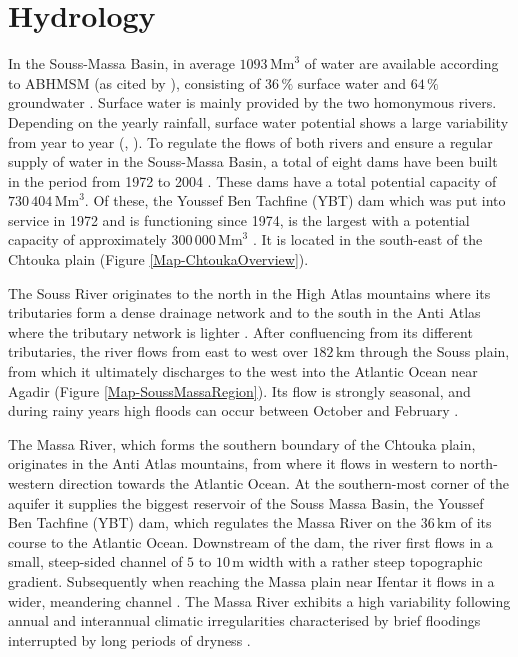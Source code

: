 \section{Hydrology}
\label{Sec-SouMaHydrology}

In the Souss-Massa Basin, in average $1093 \, \textrm{Mm}^3$ of water are available according to ABHMSM (as cited by \textcite{Choukr.2017}), consisting of $36 \, \%$ surface water and $64 \, \%$ groundwater \parencite{Choukr.2017}. 
Surface water is mainly provided by the two homonymous rivers. 
Depending on the yearly rainfall, surface water potential shows a large variability from year to year (\cite{Choukr.2017}, \cite{ABHSM-HydStats.2022}). 
To regulate the flows of both rivers and ensure a regular supply of water in the Souss-Massa Basin, a total of eight dams have been built in the period from 1972 to 2004 \parencite{Choukr.2017}. 
These dams have a total potential capacity of $730 \, 404 \, \textrm{Mm}^3$. 
Of these, the Youssef Ben Tachfine (YBT) dam which was put into service in 1972 and is functioning since 1974, is the largest with a potential capacity of approximately $300 \,000 \, \textrm{Mm}^3$ \parencite{ABHSM-Dams.2022}. 
It is located in the south-east of the Chtouka plain (Figure \ref{Map-ChtoukaOverview}).

The Souss River originates to the north in the High Atlas mountains where its tributaries form a dense drainage network and to the south in the Anti Atlas where the tributary network is lighter \parencite{Hssaisoune.2017}. 
After confluencing from its different tributaries, the river flows from east to west over $182 \, \textrm{km}$ through the Souss plain, from which it ultimately discharges to the west into the Atlantic Ocean near Agadir (Figure \ref{Map-SoussMassaRegion}). 
Its flow is strongly seasonal, and during rainy years high floods can occur between October and February \parencite{Hssaisoune.2017}.

The Massa River, which forms the southern boundary of the Chtouka plain, originates in the Anti Atlas mountains, from where it flows in western to north-western direction towards the Atlantic Ocean. 
At the southern-most corner of the aquifer it supplies the biggest reservoir of the Souss Massa Basin, the Youssef Ben Tachfine (YBT) dam, which regulates the Massa River on the $36 \, \textrm{km}$ of its course to the Atlantic Ocean. 
Downstream of the dam, the river first flows in a small, steep-sided channel of $5$ to $10 \, \textrm{m}$ width with a rather steep topographic gradient. 
Subsequently when reaching the Massa plain near Ifentar it flows in a wider, meandering channel \parencite{Horn.2021}. 
The Massa River exhibits a high variability following annual and interannual climatic irregularities characterised by brief floodings interrupted by long periods of dryness \parencite{Hssaisoune.2017}.

